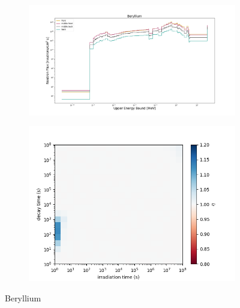 \begin{figure}[!ht]
    \begin{subfigure}{0.5\textwidth}
        \includegraphics[scale=0.23, trim={4cm 1cm 4cm 2cm},clip]{figs/be_flux.png}
    \end{subfigure}
    \begin{subfigure}{0.5\textwidth}
        \centering
        \includegraphics[scale=0.45, trim={0cm 0cm 2cm 0cm},clip]{figs/be_front.png}
    \end{subfigure}
    \caption{Beryllium }
    \label{fig:1spec_8v}
\end{figure}
